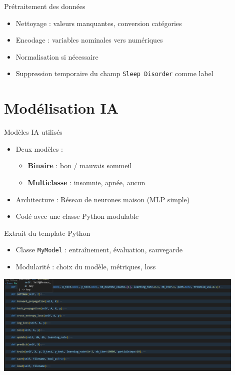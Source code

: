 \documentclass{beamer}
\begin{document}
\begin{frame}{Prétraitement des données}
  \begin{itemize}
    \item Nettoyage : valeurs manquantes, conversion catégories
    \item Encodage : variables nominales vers numériques
    \item Normalisation si nécessaire
    \item Suppression temporaire du champ \texttt{Sleep Disorder} comme label
  \end{itemize}
\end{frame}

\section{Modélisation IA}

\begin{frame}{Modèles IA utilisés}
  \begin{itemize}
    \item Deux modèles :
    \begin{itemize}
      \item \textbf{Binaire} : bon / mauvais sommeil
      \item \textbf{Multiclasse} : insomnie, apnée, aucun
    \end{itemize}
    \item Architecture : Réseau de neurones maison (MLP simple)
    \item Codé avec une classe Python modulable
  \end{itemize}
\end{frame}

\begin{frame}{Extrait du template Python}
  \begin{itemize}
    \item Classe \texttt{MyModel} : entraînement, évaluation, sauvegarde
    \item Modularité : choix du modèle, métriques, loss
  \end{itemize}
  \includegraphics[width=0.9\textwidth]{screen_code.png}
\end{frame}
\end{document}
